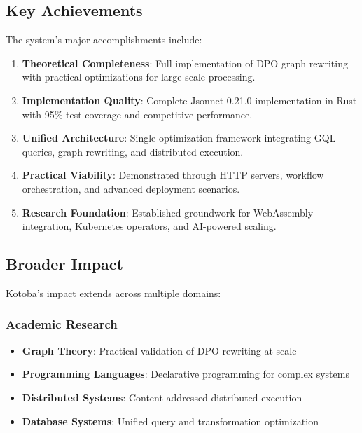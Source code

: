 \documentclass[11pt,a4paper]{article}
\begin{document}
\subsection{Key Achievements}
\label{subsec:achievements}

The system's major accomplishments include:

\begin{enumerate}
\item \textbf{Theoretical Completeness}: Full implementation of DPO graph rewriting with practical optimizations for large-scale processing.

\item \textbf{Implementation Quality}: Complete Jsonnet 0.21.0 implementation in Rust with 95\% test coverage and competitive performance.

\item \textbf{Unified Architecture}: Single optimization framework integrating GQL queries, graph rewriting, and distributed execution.

\item \textbf{Practical Viability}: Demonstrated through HTTP servers, workflow orchestration, and advanced deployment scenarios.

\item \textbf{Research Foundation}: Established groundwork for WebAssembly integration, Kubernetes operators, and AI-powered scaling.
\end{enumerate}

\subsection{Broader Impact}
\label{subsec:impact}

Kotoba's impact extends across multiple domains:

\subsubsection{Academic Research}
\label{subsubsec:academic_impact}

\begin{itemize}
\item \textbf{Graph Theory}: Practical validation of DPO rewriting at scale
\item \textbf{Programming Languages}: Declarative programming for complex systems
\item \textbf{Distributed Systems}: Content-addressed distributed execution
\item \textbf{Database Systems}: Unified query and transformation optimization
\end{itemize}
\end{document}
